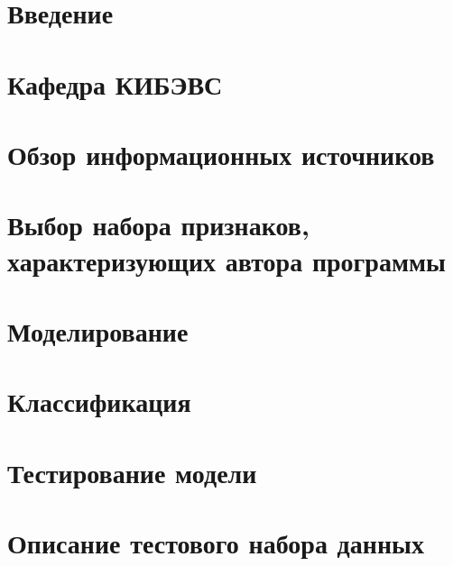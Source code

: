 
 

\newpage
%  
 
 \newpage
 
 
 
 
 \newpage
{}
 \tableofcontents

\newpage
\setcounter{section}{0}
\section*{Введение}


\newpage
\section{Кафедра КИБЭВС}



\newpage 
\section{Обзор информационных источников }







\newpage 
\section{Выбор набора признаков, характеризующих автора программы}\label{features}
 
 
\newpage  
\section{Моделирование}\label{modeling}

 
 
\newpage  
\section{Классификация}\label{classifiers}


\newpage
\section{Тестирование модели}\label{crossval}


\newpage 
\section{Описание тестового набора данных}\label{test_data}

\clearpage
